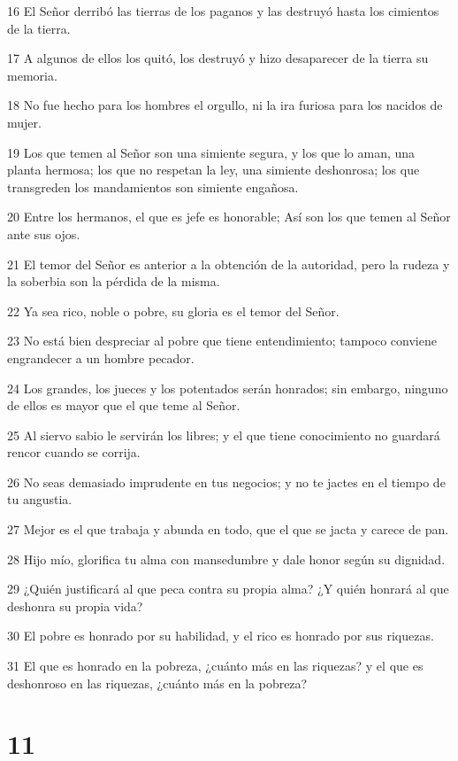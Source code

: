 \par 16 El Señor derribó las tierras de los paganos y las destruyó hasta los cimientos de la tierra.
\par 17 A algunos de ellos los quitó, los destruyó y hizo desaparecer de la tierra su memoria.
\par 18 No fue hecho para los hombres el orgullo, ni la ira furiosa para los nacidos de mujer.
\par 19 Los que temen al Señor son una simiente segura, y los que lo aman, una planta hermosa; los que no respetan la ley, una simiente deshonrosa; los que transgreden los mandamientos son simiente engañosa.
\par 20 Entre los hermanos, el que es jefe es honorable; Así son los que temen al Señor ante sus ojos.
\par 21 El temor del Señor es anterior a la obtención de la autoridad, pero la rudeza y la soberbia son la pérdida de la misma.
\par 22 Ya sea rico, noble o pobre, su gloria es el temor del Señor.
\par 23 No está bien despreciar al pobre que tiene entendimiento; tampoco conviene engrandecer a un hombre pecador.
\par 24 Los grandes, los jueces y los potentados serán honrados; sin embargo, ninguno de ellos es mayor que el que teme al Señor.
\par 25 Al siervo sabio le servirán los libres; y el que tiene conocimiento no guardará rencor cuando se corrija.
\par 26 No seas demasiado imprudente en tus negocios; y no te jactes en el tiempo de tu angustia.
\par 27 Mejor es el que trabaja y abunda en todo, que el que se jacta y carece de pan.
\par 28 Hijo mío, glorifica tu alma con mansedumbre y dale honor según su dignidad.
\par 29 ¿Quién justificará al que peca contra su propia alma? ¿Y quién honrará al que deshonra su propia vida?
\par 30 El pobre es honrado por su habilidad, y el rico es honrado por sus riquezas.
\par 31 El que es honrado en la pobreza, ¿cuánto más en las riquezas? y el que es deshonroso en las riquezas, ¿cuánto más en la pobreza?

\chapter{11}

